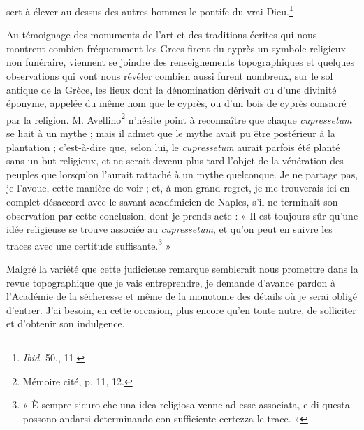 \documentclass{article}
\begin{document}
sert à élever au-dessus des autres hommes le pontife du vrai Dieu.\footnote{\emph{Ibid.} 50., 11.}

Au témoignage des monuments de l'art et des traditions écrites qui nous montrent combien fréquemment les Grecs firent du cyprès un symbole religieux non funéraire, viennent se joindre des renseignements topographiques et quelques observations qui vont nous révéler combien aussi furent nombreux, sur le sol antique de la Grèce, les lieux dont la dénomination dérivait ou d'une divinité éponyme, appelée du même nom que le cyprès, ou d'un bois de cyprès consacré par la religion. M. Avellino\footnote{Mémoire cité, p. 11, 12.} n'hésite point à reconnaître que chaque \emph{cupressetum} se liait à un mythe ; mais il admet que le mythe avait pu être postérieur à la plantation ; c'est-à-dire que, selon lui, le \emph{cupressetum} aurait parfois été planté sans un but religieux, et ne serait devenu plus tard l'objet de la vénération des peuples que lorsqu'on l'aurait rattaché à un mythe quelconque. Je ne partage pas, je l'avoue, cette manière de voir ; et, à mon grand regret, je me trouverais ici en complet désaccord avec le savant académicien de Naples, s'il ne terminait son observation par cette conclusion, dont je prends acte : « Il est toujours sûr qu'une idée religieuse se trouve associée au \emph{cupressetum}, et qu'on peut en suivre les traces avec une certitude suffisante.\footnote{« È sempre sicuro che una idea religiosa venne ad esse associata, e di questa possono andarsi determinando con sufficiente certezza le trace. »} »

Malgré la variété que cette judicieuse remarque semblerait nous promettre dans la revue topographique que je vais entreprendre, je demande d'avance pardon à l'Académie de la sécheresse et même de la monotonie des détails où je serai obligé d'entrer. J'ai besoin, en cette occasion, plus encore qu'en toute autre, de solliciter et d'obtenir son indulgence.
\end{document}
